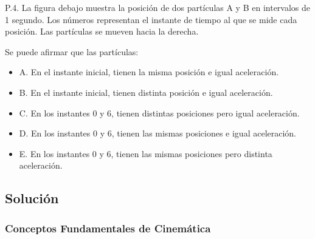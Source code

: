 \documentclass[12pt, a4paper]{article}
\begin{document}
P.4. La figura debajo muestra la posición de dos partículas A y B en intervalos de 1 segundo. Los números representan el instante de tiempo al que se mide cada posición. Las partículas se mueven hacia la derecha.

\vspace{0.5cm}
\begin{center}
\end{center}
\vspace{0.5cm}

Se puede afirmar que las partículas:

\begin{itemize}
    \item A. En el instante inicial, tienen la misma posición e igual aceleración.
    \item B. En el instante inicial, tienen distinta posición e igual aceleración.
    \item C. En los instantes 0 y 6, tienen distintas posiciones pero igual aceleración.
    \item D. En los instantes 0 y 6, tienen las mismas posiciones e igual aceleración.
    \item E. En los instantes 0 y 6, tienen las mismas posiciones pero distinta aceleración.
\end{itemize}

\subsection*{Solución}

\subsubsection*{Conceptos Fundamentales de Cinemática}
\end{document}
